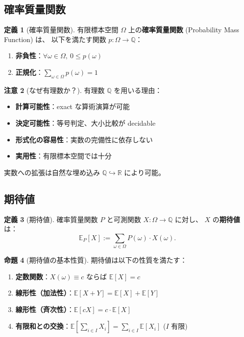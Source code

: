 \documentclass[a4paper,12pt]{ltjsarticle}
\theoremstyle{definition}
\newtheorem{definition}{定義}[section]
\newtheorem{proposition}[definition]{命題}
\newtheorem{remark}[definition]{注意}
\begin{document}
\subsection{確率質量関数}

\begin{definition}[確率質量関数]
有限標本空間 $\Omega$ 上の\textbf{確率質量関数} (Probability Mass Function) は、
以下を満たす関数 $p : \Omega \to \mathbb{Q}$：
\begin{enumerate}
  \item \textbf{非負性}：$\forall \omega \in \Omega,\ 0 \leq p(\omega)$
  \item \textbf{正規化}：$\sum_{\omega \in \Omega} p(\omega) = 1$
\end{enumerate}
\end{definition}

\begin{remark}[なぜ有理数か？]
有理数 $\mathbb{Q}$ を用いる理由：
\begin{itemize}
  \item \textbf{計算可能性}：exact な算術演算が可能
  \item \textbf{決定可能性}：等号判定、大小比較が decidable
  \item \textbf{形式化の容易性}：実数の完備性に依存しない
  \item \textbf{実用性}：有限標本空間では十分
\end{itemize}
実数への拡張は自然な埋め込み $\mathbb{Q} \hookrightarrow \mathbb{R}$ により可能。
\end{remark}

\subsection{期待値}

\begin{definition}[期待値]
確率質量関数 $P$ と可測関数 $X : \Omega \to \mathbb{Q}$ に対し、
$X$ の\textbf{期待値}は：
\[
  \mathbb{E}_P[X] := \sum_{\omega \in \Omega} P(\omega) \cdot X(\omega).
\]
\end{definition}

\begin{proposition}[期待値の基本性質]
期待値は以下の性質を満たす：
\begin{enumerate}
  \item \textbf{定数関数}：$X(\omega) \equiv c$ ならば $\mathbb{E}[X] = c$
  \item \textbf{線形性（加法性）}：$\mathbb{E}[X + Y] = \mathbb{E}[X] + \mathbb{E}[Y]$
  \item \textbf{線形性（斉次性）}：$\mathbb{E}[cX] = c \cdot \mathbb{E}[X]$
  \item \textbf{有限和との交換}：$\mathbb{E}\left[\sum_{i \in I} X_i\right] = \sum_{i \in I} \mathbb{E}[X_i]$ \quad ($I$ 有限)
\end{enumerate}
\end{proposition}
\end{document}
